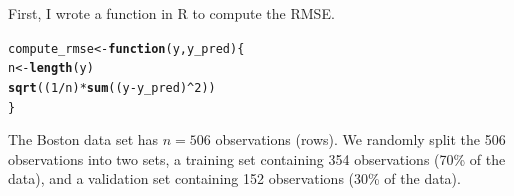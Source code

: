 \documentclass[11pt]{article}\usepackage[]{graphicx}\usepackage[]{color}
\makeatletter
\newcommand{\hlnum}[1]{\textcolor[rgb]{0.686,0.059,0.569}{#1}}%
\newcommand{\hlopt}[1]{\textcolor[rgb]{0,0,0}{#1}}%
\newcommand{\hlstd}[1]{\textcolor[rgb]{0.345,0.345,0.345}{#1}}%
\newcommand{\hlkwa}[1]{\textcolor[rgb]{0.161,0.373,0.58}{\textbf{#1}}}%
\newcommand{\hlkwb}[1]{\textcolor[rgb]{0.69,0.353,0.396}{#1}}%
\newcommand{\hlkwc}[1]{\textcolor[rgb]{0.333,0.667,0.333}{#1}}%
\newcommand{\hlkwd}[1]{\textcolor[rgb]{0.737,0.353,0.396}{\textbf{#1}}}%
\newenvironment{kframe}{%
 \def\at@end@of@kframe{}%
 \ifinner\ifhmode%
  \def\at@end@of@kframe{\end{minipage}}%
  \begin{minipage}{\columnwidth}%
 \fi\fi%
 \def\FrameCommand##1{\hskip\@totalleftmargin \hskip-\fboxsep
 \colorbox{shadecolor}{##1}\hskip-\fboxsep
     \hskip-\linewidth \hskip-\@totalleftmargin \hskip\columnwidth}%
 \MakeFramed {\advance\hsize-\width
   \@totalleftmargin\z@ \linewidth\hsize
   \@setminipage}}%
 {\par\unskip\endMakeFramed%
 \at@end@of@kframe}
\newenvironment{knitrout}{}{} %
\makeatother
\begin{document}
First, I wrote a function in R to compute the RMSE.  
\begin{knitrout}
\color{fgcolor}\begin{kframe}
\begin{alltt}
\hlstd{compute_rmse} \hlkwb{<-} \hlkwa{function}\hlstd{(}\hlkwc{y}\hlstd{,} \hlkwc{y_pred}\hlstd{) \{}
  \hlstd{n} \hlkwb{<-} \hlkwd{length}\hlstd{(y)}
  \hlkwd{sqrt}\hlstd{((}\hlnum{1} \hlopt{/} \hlstd{n)} \hlopt{*} \hlkwd{sum}\hlstd{((y} \hlopt{-} \hlstd{y_pred)}\hlopt{^}\hlnum{2}\hlstd{))}
\hlstd{\}}
\end{alltt}
\end{kframe}
\end{knitrout}

The Boston data set has $n=506$ observations (rows).  We randomly split the 506 observations into two sets, a training set containing 354 observations (70\% of the data), and a validation set containing 152 observations (30\% of the data).
\end{document}
